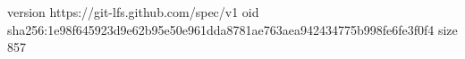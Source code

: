 version https://git-lfs.github.com/spec/v1
oid sha256:1e98f645923d9e62b95e50e961dda8781ae763aea942434775b998fe6fe3f0f4
size 857
